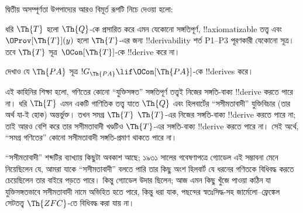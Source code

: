 \documentclass[../../../include/open-logic-section]{subfiles}
\begin{document}
দ্বিতীয় অসম্পূর্ণতা উপপাদ্যের আরও বিমূর্ত রূপটি নিচে দেওয়া হলো:

\begin{thm}
 ধরি $\Th{T}$ হলো $\Th{Q}$-কে
প্রসারিত করে এমন যেকোনো সঙ্গতিপূর্ণ, !!{axiomatizable} তত্ত্ব এবং
$\OProv[\Th{T}](y)$ হলো $\Th{T}$-এর জন্য !!{derivability} শর্ত P1--P3
পূরণকারী যেকোনো সূত্র। তবে $\Th{T}$ সূত্র~$\OCon[\Th{T}]$-কে !!{derive}
করে না।
\end{thm}

\begin{prob}
দেখাও যে $\Th{PA}$ সূত্র $!G_{\Th{PA}} \lif \OCon[\Th{PA}]$-কে
!!{derive}s করে।
\end{prob}

\begin{digress}
এই কাহিনির শিক্ষা হলো, গণিতের কোনো ``যুক্তিসঙ্গত'' সঙ্গতিপূর্ণ তত্ত্বই
নিজের সঙ্গতি-বাক্য !!{derive} করতে পারে না। ধরি $\Th{T}$ এমন একটি
গাণিতিক তত্ত্ব যাতে $\Th{Q}$ এবং হিলবার্টের ``সসীমতাবাদী'' যুক্তিবিচার
(তার অর্থ যা-ই হোক) অন্তর্ভুক্ত। তখন সমগ্র $\Th{T}$ $\Th{T}$-এর নিজের
সঙ্গতি-বাক্য !!{derive} করতে পারে না; তাই আরও বেশি করে তার সসীমতাবাদী
খণ্ডটিও $\Th{T}$-এর সঙ্গতি-বাক্য !!{derive} করতে পারে না। সেই অর্থে,
``সমগ্র গণিতের'' কোনো সসীমতাবাদী সঙ্গতি-প্রমাণ থাকতে পারে না।

``সসীমতাবাদী'' শব্দটির ব্যাখ্যায় কিছুটা অবকাশ আছে; ১৯৩১ সালের
গবেষণাপত্রে গ্যোডেল এই সম্ভাবনা মেনে নিয়েছিলেন যে, আমরা যাকে
``সসীমতাবাদী'' বলতে পারি তার কিছু অংশ হিলবার্ট যে ধরনের গণিতকে বিধিবদ্ধ
করতে চেয়েছিলেন তার বাইরে পড়তে পারে। কিন্তু গ্যোডেল উদার ছিলেন; আজ এমন
কিছু খুঁজে পাওয়া কঠিন যা যুক্তিসঙ্গতভাবে সসীমতাবাদী নামে অভিহিত হতে পারে,
কিন্তু ধরা যাক, পছন্দের স্বতঃসিদ্ধ-সহ জার্মেলো--ফ্রেঙ্কেল সেটতত্ত্ব
$\Th{ZFC}$-তে বিধিবদ্ধ করা যায় না।
\end{digress}
\end{document}
